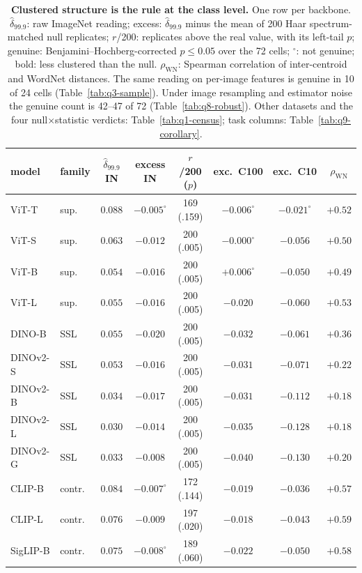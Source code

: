 \begin{table}[t]
\centering
\small
\setlength{\tabcolsep}{3.4pt}
\begin{tabular}{l l c c c c c c}
\toprule
model & family & $\hat\delta_{99.9}$ IN & excess IN & $r$/200 ($p$) & exc.\ C100 & exc.\ C10 & $\rho_{\text{WN}}$ \\
\midrule
ViT-T & sup. & $0.088$ & $-0.005^{\circ}$ & 169 (.159) & $-0.006^{\circ}$ & $-0.021^{\circ}$ & $+0.52$ \\
ViT-S & sup. & $0.063$ & $-0.012$ & 200 (.005) & $-0.000^{\circ}$ & $-0.056$ & $+0.50$ \\
ViT-B & sup. & $0.054$ & $-0.016$ & 200 (.005) & \textbf{$+0.006^{\circ}$} & $-0.050$ & $+0.49$ \\
ViT-L & sup. & $0.055$ & $-0.016$ & 200 (.005) & $-0.020$ & $-0.060$ & $+0.53$ \\
\midrule
DINO-B & SSL & $0.055$ & $-0.020$ & 200 (.005) & $-0.032$ & $-0.061$ & $+0.36$ \\
DINOv2-S & SSL & $0.053$ & $-0.016$ & 200 (.005) & $-0.031$ & $-0.071$ & $+0.22$ \\
DINOv2-B & SSL & $0.034$ & $-0.017$ & 200 (.005) & $-0.031$ & $-0.112$ & $+0.18$ \\
DINOv2-L & SSL & $0.030$ & $-0.014$ & 200 (.005) & $-0.035$ & $-0.128$ & $+0.18$ \\
DINOv2-G & SSL & $0.033$ & $-0.008$ & 200 (.005) & $-0.040$ & $-0.130$ & $+0.20$ \\
\midrule
CLIP-B & contr. & $0.084$ & $-0.007^{\circ}$ & 172 (.144) & $-0.019$ & $-0.036$ & $+0.57$ \\
CLIP-L & contr. & $0.076$ & $-0.009$ & 197 (.020) & $-0.018$ & $-0.043$ & $+0.59$ \\
SigLIP-B & contr. & $0.075$ & $-0.008^{\circ}$ & 189 (.060) & $-0.022$ & $-0.050$ & $+0.58$ \\
\bottomrule
\end{tabular}
\caption{\textbf{Clustered structure is the rule at the class level.} One row per backbone. $\hat\delta_{99.9}$: raw ImageNet reading; excess: $\hat\delta_{99.9}$ minus the mean of 200 Haar spectrum-matched null replicates; $r$/200: replicates above the real value, with its left-tail $p$; genuine: Benjamini--Hochberg-corrected $p\le0.05$ over the 72 cells; $^{\circ}$: not genuine; bold: less clustered than the null. $\rho_{\text{WN}}$: Spearman correlation of inter-centroid and WordNet distances. The same reading on per-image features is genuine in 10 of 24 cells (Table~\ref{tab:q3-sample}). Under image resampling and estimator noise the genuine count is 42--47 of 72 (Table~\ref{tab:q8-robust}). Other datasets and the four null$\times$statistic verdicts: Table~\ref{tab:q1-census}; task columns: Table~\ref{tab:q9-corollary}. %
}
\label{tab:census}
\end{table}
